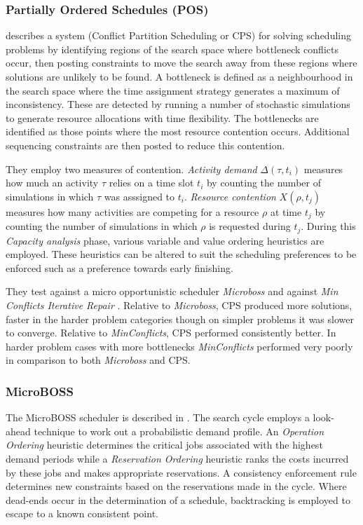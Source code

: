 \subsubsection{Partially Ordered Schedules (POS)}
\citet{muscettola92bottleneck} describes a system (Conflict Partition Scheduling or CPS) for solving scheduling problems by identifying regions of the search space where bottleneck conflicts occur, then posting constraints to move the search away from these regions where solutions are unlikely to be found. A bottleneck is defined as a neighbourhood in the search space where the time assignment strategy generates a maximum of inconsistency. These are detected by running a number of stochastic simulations to generate resource allocations with time flexibility. The bottlenecks are identified as those points where the most resource contention occurs. Additional sequencing constraints are then posted to reduce this contention. 

They employ two measures of contention. \emph{Activity demand} $\Delta(\tau,t_i)$ measures how much an activity $\tau$ relies on a time slot $t_i$ by counting the number of simulations in which $\tau$ was asssigned to $t_i$. \emph{Resource contention} $X(\rho,t_j)$ measures how many activities are competing for a resource $\rho$ at time $t_j$ by counting the number of simulations in which $\rho$ is requested during $t_j$. During this \emph{Capacity analysis} phase, various variable and value ordering heuristics are employed. These heuristics can be altered to suit the scheduling preferences to be enforced such as a preference towards early finishing.



They test against a micro opportunistic scheduler \emph{Microboss} \citep{sadeh91lookahead} and against \emph{Min Conflicts Iterative Repair} \citep{minton92minconflicts}. Relative to \emph{Microboss}, CPS produced more solutions, faster in the harder problem categories though on simpler problems it was slower to converge. Relative to \emph{MinConflicts}, CPS performed consistently better. In harder problem cases with more bottlenecks \emph{MinConflicts} performed very poorly in comparison to both \emph{Microboss} and CPS. 


\subsubsection{MicroBOSS}
The MicroBOSS scheduler is described in \citep{sadeh91lookahead}. The search cycle employs a look-ahead technique to work out a probabilistic demand profile. An \emph{Operation Ordering} heuristic determines the critical jobs associated with the  highest demand periods while a \emph{Reservation Ordering} heuristic ranks the costs incurred by these jobs and makes appropriate reservations. A consistency enforcement rule determines new constraints based on the reservations made in the cycle. Where dead-ends occur in the determination of a schedule, backtracking is employed to escape to a known consistent point.

